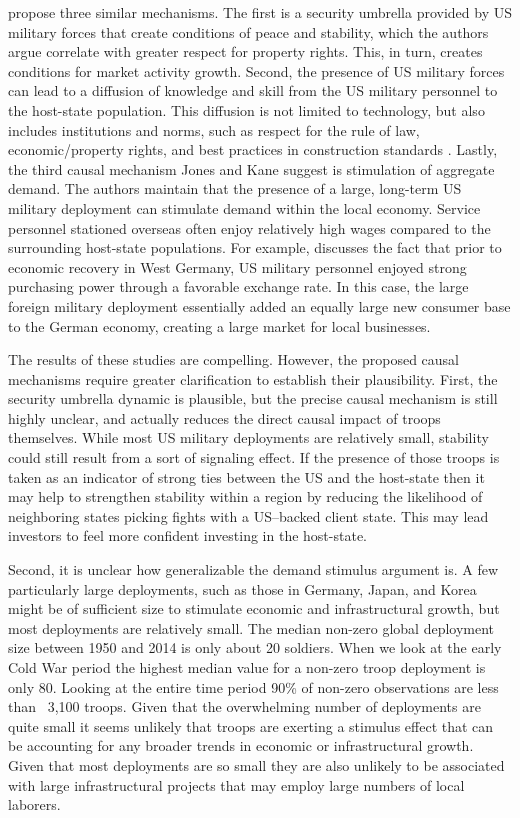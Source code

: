 \documentclass[12pt]{article}
\begin{document}
\begin{doublespace}
 propose three similar mechanisms. The first is a security umbrella provided by US military forces that create conditions of peace and stability, which the authors argue correlate with greater respect for property rights. This, in turn, creates conditions for market activity growth. Second, the presence of US military forces can lead to a diffusion of knowledge and skill from the US military personnel to the host-state population. This diffusion is not limited to technology, but also includes institutions and norms, such as respect for the rule of law, economic/property rights, and best practices in construction standards \cite[228]{jones2012us}. Lastly, the third causal mechanism Jones and Kane suggest is stimulation of aggregate demand. The authors maintain that the presence of a large, long-term US military deployment can stimulate demand within the local economy. Service personnel stationed overseas often enjoy relatively high wages compared to the surrounding host-state populations. For example,  discusses the fact that prior to economic recovery in West Germany, US military personnel enjoyed strong purchasing power through a favorable exchange rate. In this case, the large foreign military deployment essentially added an equally large new consumer base to the German economy, creating a large market for local businesses.

The results of these studies are compelling. However, the proposed causal mechanisms require greater clarification to establish their plausibility. First, the security umbrella dynamic is plausible, but the precise causal mechanism is still highly unclear, and actually reduces the direct causal impact of troops themselves. While most US military deployments are relatively small, stability could still result from a sort of signaling effect. If the presence of those troops is taken as an indicator of strong ties between the US and the host-state then it may help to strengthen stability within a region by reducing the likelihood of neighboring states picking fights with a US--backed client state. This may lead investors to feel more confident investing in the host-state. 

Second, it is unclear how generalizable the demand stimulus argument is. A few particularly large deployments, such as those in Germany, Japan, and Korea might be of sufficient size to stimulate economic and infrastructural growth, but most deployments are relatively small. The median non-zero global deployment size between 1950 and 2014 is only about 20 soldiers. When we look at the early Cold War period the highest median value for a non-zero troop deployment is only 80. Looking at the entire time period 90\% of non-zero observations are less than ~3,100 troops. Given that the overwhelming number of deployments are quite small it seems unlikely that troops are exerting a stimulus effect that can be accounting for any broader trends in economic or infrastructural growth. Given that most deployments are so small they are also unlikely to be associated with large infrastructural projects that may employ large numbers of local laborers. 


\end{doublespace}
\end{document}
